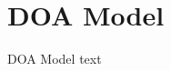
\section{DOA Model}\fbeg{}\begin{frame}{}

{\fontsize{20}{23}\selectfont

DOA Model text

}

\end{frame}

